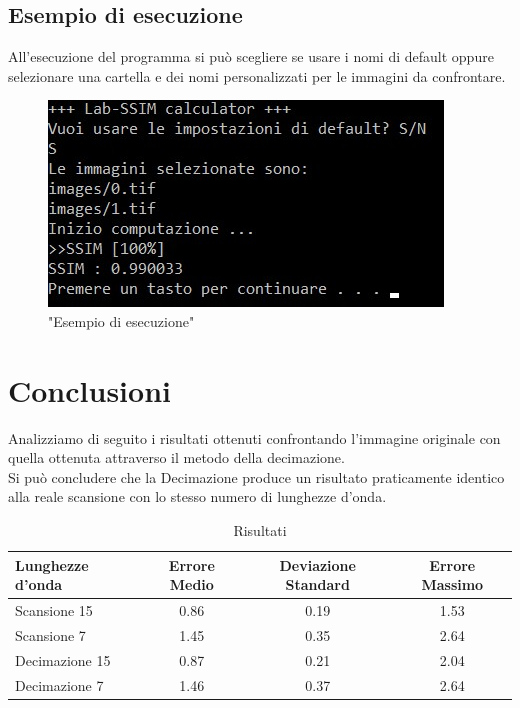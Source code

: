 \documentclass[a4paper,11pt]{article}
\begin{document}
    \subsection{Esempio di esecuzione}
    All'esecuzione del programma si può scegliere se usare i nomi di default oppure selezionare una cartella e dei nomi personalizzati per le immagini da confrontare.
    \begin{figure}[h]
        \centering
        \includegraphics[scale=0.9]{esempio}
        \caption{"Esempio di esecuzione"}
    \end{figure}
    \newpage
    \section{Conclusioni} 
    Analizziamo di seguito i risultati ottenuti confrontando l'immagine originale con quella ottenuta attraverso il metodo della decimazione. \\
    Si può concludere che la Decimazione produce un risultato praticamente identico alla reale scansione con lo stesso numero di lunghezze d’onda.
    \begin{table}[h!]
        \begin{center}
          \caption{Risultati}
          \label{tab:table1}
           \begin{tabular}{l|c|c|c} 
            \textbf{Lunghezze d'onda} & \textbf{Errore Medio} & \textbf{Deviazione Standard} & \textbf{Errore Massimo}\\
            \hline
            Scansione 15 & 0.86 & 0.19 & 1.53\\
            Scansione 7 & 1.45 & 0.35 & 2.64\\
            Decimazione 15 & 0.87 & 0.21 & 2.04\\
            Decimazione 7 & 1.46 & 0.37 & 2.64\\
          \end{tabular}
        \end{center}
      \end{table}
  
\end{document}
